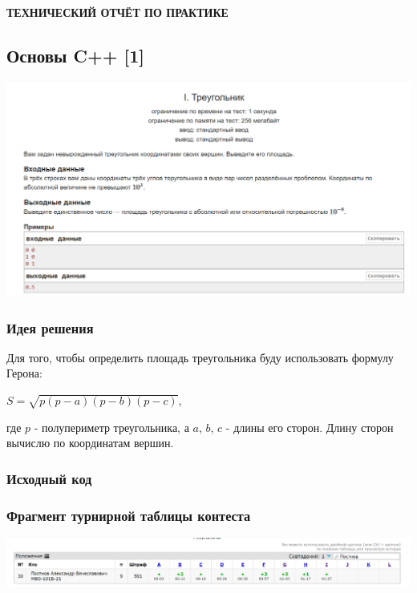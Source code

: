 %
%

\begin{center}
\bfseries{\large ТЕХНИЧЕСКИЙ ОТЧЁТ ПО ПРАКТИКЕ}
\end{center}

\subsection*{Основы C++ [1]}
\begin{center}
\includegraphics[width=\textwidth]{statements/1.png}
\end{center}
\subsubsection*{Идея решения}
Для того, чтобы определить площадь треугольника буду использовать формулу Герона:

$S=\sqrt{p(p-a)(p-b)(p-c)}$,

где $p$ - полупериметр треугольника, а $a$, $b$, $c$ - длины его сторон. Длину сторон вычислю по координатам вершин.

\subsubsection*{Исходный код}


\subsubsection*{Фрагмент турнирной таблицы контеста}
\begin{center}
\includegraphics[width=\textwidth]{standings/1.png}\newline\noindent
\end{center}

